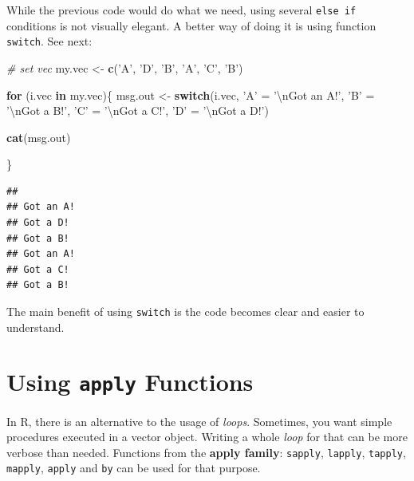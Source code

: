 \documentclass[11pt,]{book}
\newenvironment{Shaded}{\begin{snugshade}}{\end{snugshade}}
\newcommand{\KeywordTok}[1]{\textcolor[rgb]{0.27,0.27,0.27}{\textbf{#1}}}
\newcommand{\CharTok}[1]{\textcolor[rgb]{0.5,0.5,0.5}{#1}}
\newcommand{\StringTok}[1]{\textcolor[rgb]{0.5,0.5,0.5}{#1}}
\newcommand{\CommentTok}[1]{\textcolor[rgb]{0.56,0.35,0.01}{\textit{#1}}}
\newcommand{\ControlFlowTok}[1]{\textcolor[rgb]{0.13,0.29,0.53}{\textbf{#1}}}
\newcommand{\NormalTok}[1]{#1}
\begin{document}
While the previous code would do what we need, using several
\texttt{else\ if} conditions is not visually elegant. A better way of
doing it is using function \texttt{switch}. See next:

\begin{Shaded}
\begin{Highlighting}[]
\CommentTok{# set vec}
\NormalTok{my.vec <-}\StringTok{ }\KeywordTok{c}\NormalTok{(}\StringTok{'A'}\NormalTok{, }\StringTok{'D'}\NormalTok{, }\StringTok{'B'}\NormalTok{, }\StringTok{'A'}\NormalTok{, }\StringTok{'C'}\NormalTok{, }\StringTok{'B'}\NormalTok{)}

\ControlFlowTok{for}\NormalTok{ (i.vec }\ControlFlowTok{in}\NormalTok{ my.vec)\{}
\NormalTok{  msg.out <-}\StringTok{ }\ControlFlowTok{switch}\NormalTok{(i.vec, }
                  \StringTok{'A'}\NormalTok{ =}\StringTok{ '}\CharTok{\textbackslash{}n}\StringTok{Got an A!'}\NormalTok{,}
                  \StringTok{'B'}\NormalTok{ =}\StringTok{ '}\CharTok{\textbackslash{}n}\StringTok{Got a B!'}\NormalTok{,}
                  \StringTok{'C'}\NormalTok{ =}\StringTok{ '}\CharTok{\textbackslash{}n}\StringTok{Got a C!'}\NormalTok{,}
                  \StringTok{'D'}\NormalTok{ =}\StringTok{ '}\CharTok{\textbackslash{}n}\StringTok{Got a D!'}\NormalTok{)}
  
  \KeywordTok{cat}\NormalTok{(msg.out)}
  
\NormalTok{\}}
\end{Highlighting}
\end{Shaded}

\begin{verbatim}
## 
## Got an A!
## Got a D!
## Got a B!
## Got an A!
## Got a C!
## Got a B!
\end{verbatim}

The main benefit of using \texttt{switch} is the code becomes clear and
easier to understand.

\section{\texorpdfstring{Using \texttt{apply}
Functions}{Using apply Functions}}\label{using-apply-functions}

In R, there is an alternative to the usage of \emph{loops}. Sometimes,
you want simple procedures executed in a vector object. Writing a whole
\emph{loop} for that can be more verbose than needed. Functions from the
\textbf{apply family}: \texttt{sapply}, \texttt{lapply},
\texttt{tapply}, \texttt{mapply}, \texttt{apply} and \texttt{by} can be
used for that purpose.
\end{document}
